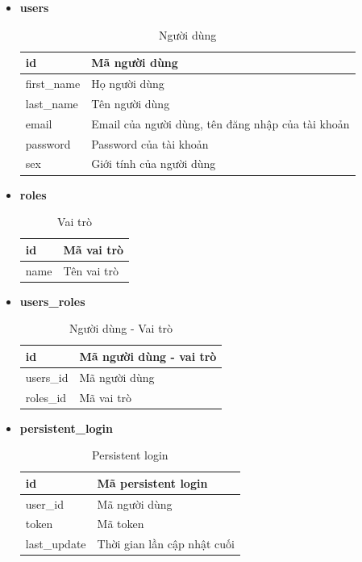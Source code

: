 \begin{itemize}
    \item \textbf{users}
    \begin{table}[H]
        \centering
        \begin{tabular}{|m{3cm}|m{10cm}|}
        \hline 
            id & Mã người dùng\\ \hline
            first\_name & Họ người dùng \\ \hline
            last\_name & Tên người dùng\\ \hline
            email & Email của người dùng, tên đăng nhập của tài khoản \\ \hline
            password & Password của tài khoản\\ \hline
            sex & Giới tính của người dùng\\
        \hline 
        \end{tabular}
        \caption{Người dùng}
        \label{users}
    \end{table}
    
    \newpage
    \item \textbf{roles}
    \begin{table}[H]
        \centering
        \begin{tabular}{|m{3cm}|m{10cm}|}
        \hline 
            id & Mã vai trò\\ \hline
            name & Tên vai trò\\
        \hline 
        \end{tabular}
        \caption{Vai trò}
        \label{roles}
    \end{table}
    
    \item \textbf{users\_roles}
    \begin{table}[H]
        \centering
        \begin{tabular}{|m{3cm}|m{10cm}|}
        \hline 
            id & Mã người dùng - vai trò\\ \hline
            users\_id & Mã người dùng\\ \hline
            roles\_id & Mã vai trò\\
        \hline 
        \end{tabular}
        \caption{Người dùng - Vai trò}
        \label{users_roles}
    \end{table}
    
    \item \textbf{persistent\_login}
    \begin{table}[H]
        \centering
        \begin{tabular}{|m{3cm}|m{10cm}|}
        \hline 
            id & Mã persistent login\\ \hline
            user\_id & Mã người dùng\\ \hline
            token & Mã token\\ \hline
            last\_update & Thời gian lần cập nhật cuối\\
        \hline 
        \end{tabular}
        \caption{Persistent login}
        \label{persistent_login}
    \end{table}
    

\end{itemize}
